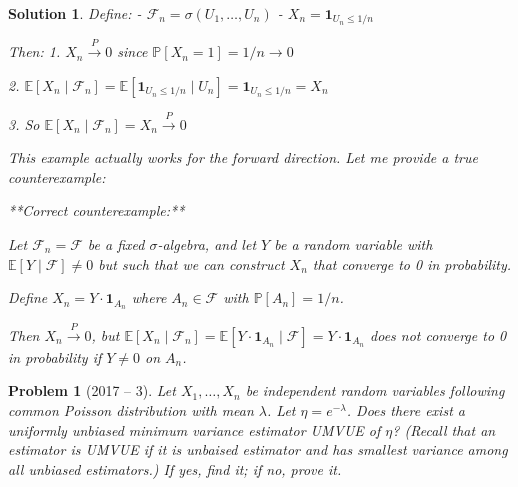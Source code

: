 \documentclass[12pt]{amsart}
\newtheorem{problem}{Problem}
\newtheorem*{solution}{Solution}
\begin{document}
\begin{solution}
Define:
- $\mathcal{F}_n = \sigma(U_1, \ldots, U_n)$
- $X_n = \mathbf{1}_{U_n \leq 1/n}$

Then:
1. $X_n \xrightarrow{P} 0$ since $\mathbb{P}[X_n = 1] = 1/n \to 0$

2. $\mathbb{E}[X_n \mid \mathcal{F}_n] = \mathbb{E}[\mathbf{1}_{U_n \leq 1/n} \mid U_n] = \mathbf{1}_{U_n \leq 1/n} = X_n$

3. So $\mathbb{E}[X_n \mid \mathcal{F}_n] = X_n \xrightarrow{P} 0$

This example actually works for the forward direction. Let me provide a true counterexample:

**Correct counterexample:**

Let $\mathcal{F}_n = \mathcal{F}$ be a fixed $\sigma$-algebra, and let $Y$ be a random variable with $\mathbb{E}[Y \mid \mathcal{F}] \neq 0$ but such that we can construct $X_n$ that converge to 0 in probability.

Define $X_n = Y \cdot \mathbf{1}_{A_n}$ where $A_n \in \mathcal{F}$ with $\mathbb{P}[A_n] = 1/n$.

Then $X_n \xrightarrow{P} 0$, but $\mathbb{E}[X_n \mid \mathcal{F}_n] = \mathbb{E}[Y \cdot \mathbf{1}_{A_n} \mid \mathcal{F}] = Y \cdot \mathbf{1}_{A_n}$ does not converge to 0 in probability if $Y \neq 0$ on $A_n$.
\end{solution}

\begin{problem}[2017 -- 3]
Let $X_1, \ldots, X_n$ be independent random variables following common Poisson distribution with mean $\lambda$. Let $\eta=e^{-\lambda}$. Does there exist a uniformly unbiased minimum variance estimator UMVUE of $\eta$? (Recall that an estimator is UMVUE if it is unbaised estimator and has smallest variance among all unbiased estimators.) If yes, find it; if no, prove it.
\end{problem}
\end{document}
